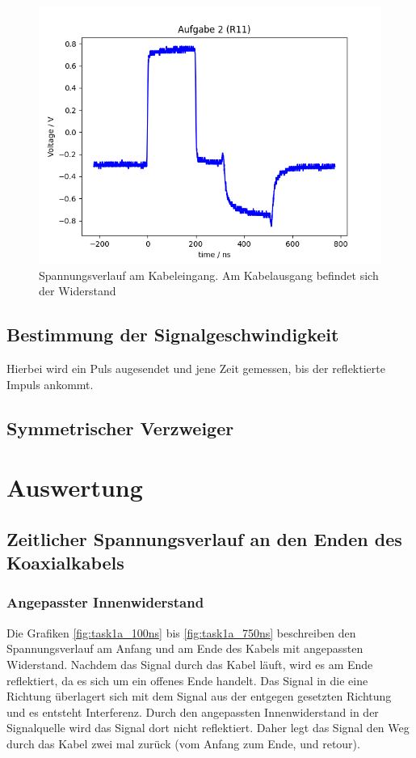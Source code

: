 \documentclass{article}
\begin{document}
\begin{figure}[H]
\centering
\caption{Spannungsverlauf am Kabeleingang. Am Kabelausgang befindet sich der Widerstand }
\label{fig:task2_R11}
\includegraphics[scale=0.6]{bilder/task2/task2_R11.png}
\end{figure}




\subsection{Bestimmung der Signalgeschwindigkeit}

Hierbei wird ein Puls augesendet und jene Zeit gemessen, bis der reflektierte Impuls ankommt.


\subsection{Symmetrischer Verzweiger}


\section{Auswertung}

\subsection{Zeitlicher Spannungsverlauf an den Enden des Koaxialkabels}

\subsubsection{Angepasster Innenwiderstand}
Die Grafiken \ref{fig:task1a_100ns} bis \ref{fig:task1a_750ns} beschreiben den Spannungsverlauf am Anfang und am Ende des Kabels mit angepassten Widerstand. Nachdem das Signal durch das Kabel läuft, wird es am Ende reflektiert, da es sich um ein offenes Ende handelt. Das Signal in die eine Richtung überlagert sich mit dem Signal aus der entgegen gesetzten Richtung und es entsteht Interferenz. Durch den angepassten Innenwiderstand in der Signalquelle wird das Signal dort nicht reflektiert. Daher legt das Signal den Weg durch das Kabel zwei mal zurück (vom Anfang zum Ende, und retour).
\end{document}
